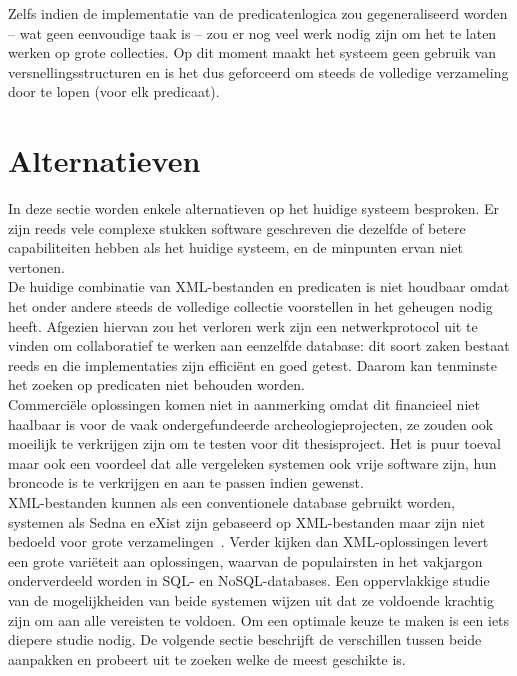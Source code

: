 Zelfs indien de implementatie van de predicatenlogica zou gegeneraliseerd worden -- wat geen eenvoudige taak is -- zou er nog veel werk nodig zijn om het te laten werken op grote collecties. Op dit moment maakt het systeem geen gebruik van versnellingsstructuren en is het dus geforceerd om steeds de volledige verzameling door te lopen (voor elk predicaat).

\section{Alternatieven}
In deze sectie worden enkele alternatieven op het huidige systeem besproken. Er zijn reeds vele complexe stukken software geschreven die dezelfde of betere capabiliteiten hebben als het huidige systeem, en de minpunten ervan niet vertonen.\\

De huidige combinatie van XML-bestanden en predicaten is niet houdbaar omdat het onder andere steeds de volledige collectie voorstellen in het geheugen nodig heeft. Afgezien hiervan zou het verloren werk zijn een netwerkprotocol uit te vinden om collaboratief te werken aan eenzelfde database: dit soort zaken bestaat reeds en die implementaties zijn effici\"ent en goed getest. Daarom kan tenminste het zoeken op predicaten niet behouden worden.\\

Commerci\"ele oplossingen komen niet in aanmerking omdat dit financieel niet haalbaar is voor de vaak ondergefundeerde archeologieprojecten, ze zouden ook moeilijk te verkrijgen zijn om te testen voor dit thesisproject. Het is puur toeval maar ook een voordeel dat alle vergeleken systemen ook vrije software zijn, hun broncode is te verkrijgen en aan te passen indien gewenst.\\ 

XML-bestanden kunnen als een conventionele database gebruikt worden, systemen als Sedna en eXist zijn gebaseerd op XML-bestanden maar zijn niet bedoeld voor grote verzamelingen~\cite{Green08}. Verder kijken dan XML-oplossingen levert een grote vari\"eteit aan oplossingen, waarvan de populairsten in het vakjargon onderverdeeld worden in SQL- en NoSQL-databases. Een oppervlakkige studie van de mogelijkheiden van beide systemen wijzen uit dat ze voldoende krachtig zijn om aan alle vereisten te voldoen. Om een optimale keuze te maken is een iets diepere studie nodig. De volgende sectie beschrijft de verschillen tussen beide aanpakken en probeert uit te zoeken welke de meest geschikte is.

